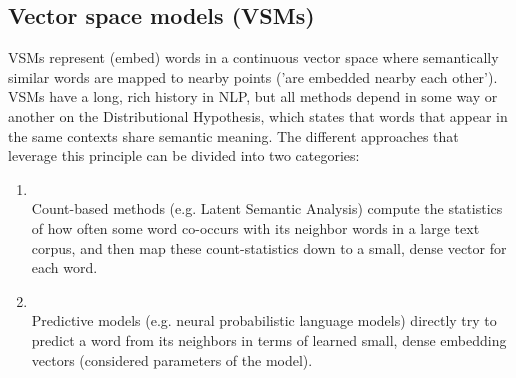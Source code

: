 \subsection{Vector space models (VSMs)}
    VSMs represent (embed) words in a continuous vector space where semantically similar words are mapped to nearby points ('are embedded nearby each other').
    VSMs have a long, rich history in NLP, but all methods depend in some way or another on the Distributional Hypothesis, which states that words that appear in the same contexts share semantic meaning. The different approaches that leverage this principle can be divided into two categories:
  
 \begin{enumerate}
      \item\textcite{Count-based methods} \\
          Count-based methods (e.g. Latent Semantic Analysis) compute the statistics of how often some word co-occurs with its neighbor words in a large text corpus, and then map these count-statistics down to a small, dense vector for each word.
      \item\textcite{predictive methods} \\
            Predictive models (e.g. neural probabilistic language models) directly try to predict a word from its neighbors in terms of learned small, dense embedding vectors (considered parameters of the model).
      
  \end{enumerate}
  
